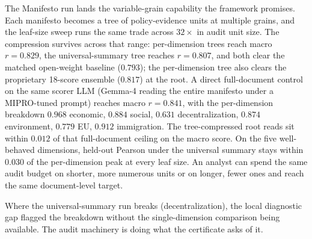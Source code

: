 The Manifesto run lands the variable-grain capability the framework
promises. Each manifesto becomes a tree of policy-evidence units at
multiple grains, and the leaf-size sweep runs the same trade
across \(32\times\) in audit unit size. The compression survives
across that range: per-dimension trees reach macro \(r=0.829\), the
universal-summary tree reaches \(r=0.807\), and both clear the
matched open-weight baseline (\(0.793\)); the per-dimension tree
also clears the proprietary 18-score ensemble (\(0.817\)) at the
root. A direct full-document control on the same scorer LLM
(Gemma-4 reading the entire manifesto under a MIPRO-tuned prompt)
reaches macro \(r=0.841\), with the per-dimension breakdown
\(0.968\) economic, \(0.884\) social, \(0.631\) decentralization,
\(0.874\) environment, \(0.779\) EU, \(0.912\) immigration. The
tree-compressed root reads sit within \(0.012\) of that
full-document ceiling on the macro score. On the five well-behaved
dimensions, held-out Pearson under the universal summary stays
within \(0.030\) of the per-dimension peak at every leaf size. An
analyst can spend the same audit budget on shorter, more numerous
units or on longer, fewer ones and reach the same document-level
target.

Where the universal-summary run breaks (decentralization), the
local diagnostic gap flagged the breakdown without the
single-dimension comparison being available. The audit machinery
is doing what the certificate asks of it.
